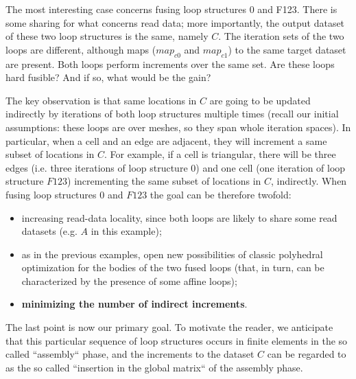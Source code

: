 \documentclass[a4paper]{article}
\begin{document}
The most interesting case concerns fusing loop structures 0 and F123. There is some sharing for what concerns read data; more importantly, the output dataset of these two loop structures is the same, namely $C$. The iteration sets of the two loops are different, although maps ($map_{c0}$ and $map_{c1}$) to the same target dataset are present. Both loops perform increments over the same set. Are these loops hard fusible? And if so, what would be the gain?

The key observation is that same locations in $C$ are going to be updated indirectly by iterations of both loop structures multiple times (recall our initial assumptions: these loops are over meshes, so they span whole iteration spaces). In particular, when a cell and an edge are adjacent, they will increment a same subset of locations in $C$. For example, if a cell is triangular, there will be three edges (i.e. three iterations of loop structure $0$) and one cell (one iteration of loop structure $F123$) incrementing the same subset of locations in $C$, indirectly. When fusing loop structures $0$ and $F123$ the goal can be therefore twofold:
\begin{itemize}
\item increasing read-data locality, since both loops are likely to share some read datasets (e.g. $A$ in this example);
\item as in the previous examples, open new possibilities of classic polyhedral optimization for the bodies of the two fused loops (that, in turn, can be characterized by the presence of some affine loops);
\item \textbf{minimizing the number of indirect increments}.
\end{itemize}
The last point is now our primary goal. To motivate the reader, we anticipate that this particular sequence of loop structures occurs in finite elements in the so called ``assembly`` phase, and the increments to the dataset $C$ can be regarded to as the so called ``insertion in the global matrix`` of the assembly phase.
\end{document}

